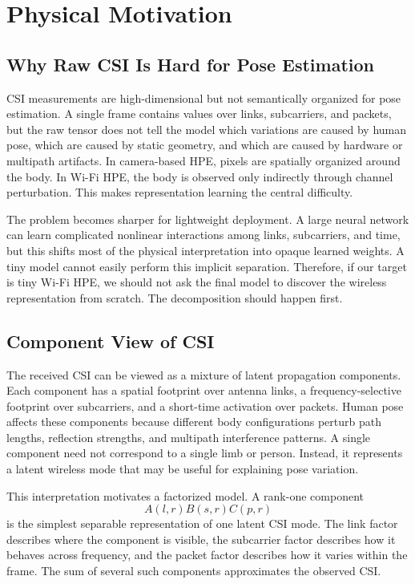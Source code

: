 \documentclass[letterpaper]{article}
\begin{document}
\section{Physical Motivation}

\subsection{Why Raw CSI Is Hard for Pose Estimation}

CSI measurements are high-dimensional but not semantically organized for pose estimation. A single frame contains values over links, subcarriers, and packets, but the raw tensor does not tell the model which variations are caused by human pose, which are caused by static geometry, and which are caused by hardware or multipath artifacts. In camera-based HPE, pixels are spatially organized around the body. In Wi-Fi HPE, the body is observed only indirectly through channel perturbation. This makes representation learning the central difficulty.

The problem becomes sharper for lightweight deployment. A large neural network can learn complicated nonlinear interactions among links, subcarriers, and time, but this shifts most of the physical interpretation into opaque learned weights. A tiny model cannot easily perform this implicit separation. Therefore, if our target is tiny Wi-Fi HPE, we should not ask the final model to discover the wireless representation from scratch. The decomposition should happen first.

\subsection{Component View of CSI}

The received CSI can be viewed as a mixture of latent propagation components. Each component has a spatial footprint over antenna links, a frequency-selective footprint over subcarriers, and a short-time activation over packets. Human pose affects these components because different body configurations perturb path lengths, reflection strengths, and multipath interference patterns. A single component need not correspond to a single limb or person. Instead, it represents a latent wireless mode that may be useful for explaining pose variation.

This interpretation motivates a factorized model. A rank-one component
\begin{equation}
    A(l,r)B(s,r)C(p,r)
\end{equation}
is the simplest separable representation of one latent CSI mode. The link factor describes where the component is visible, the subcarrier factor describes how it behaves across frequency, and the packet factor describes how it varies within the frame. The sum of several such components approximates the observed CSI.
\end{document}
